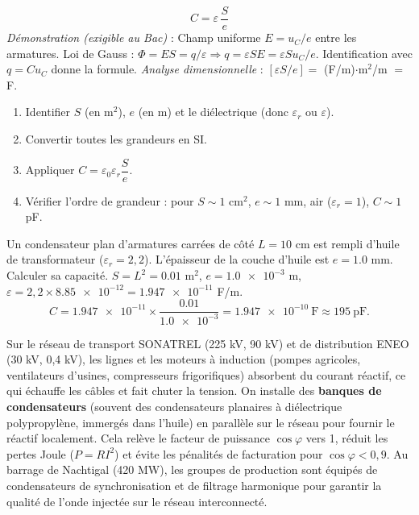 \documentclass[11pt]{article}
\begin{document}
\begin{propriete}
\[ C = \varepsilon\,\frac{S}{e} \]
\emph{Démonstration (exigible au Bac)} : Champ uniforme $E = u_C/e$ entre les armatures. Loi de Gauss : $\Phi = E S = q/\varepsilon \Rightarrow q = \varepsilon S E = \varepsilon S u_C/e$. Identification avec $q = C u_C$ donne la formule.
\emph{Analyse dimensionnelle} : $[\varepsilon S/e] = $ (F/m)$\cdot$m$^2$/m $=$ F.
\end{propriete}

\begin{methode}
\begin{enumerate}
\item Identifier $S$ (en m$^2$), $e$ (en m) et le diélectrique (donc $\varepsilon_r$ ou $\varepsilon$).
\item Convertir toutes les grandeurs en SI.
\item Appliquer $C = \varepsilon_0 \varepsilon_r \dfrac{S}{e}$.
\item Vérifier l'ordre de grandeur : pour $S \sim 1$ cm$^2$, $e \sim 1$ mm, air ($\varepsilon_r=1$), $C \sim 1$ pF.
\end{enumerate}
\end{methode}

\begin{exemplebox}
Un condensateur plan d'armatures carrées de côté $L = \num{10}$ cm est rempli d'huile de transformateur ($\varepsilon_r = 2,2$). L'épaisseur de la couche d'huile est $e = \num{1,0}$ mm. Calculer sa capacité.
\tcblower
$S = L^2 = \num{0,01}$ m$^2$, $e = \num{1,0e-3}$ m, $\varepsilon = 2,2 \times \num{8,85e-12} = \num{1,947e-11}$ F/m.
\[ C = \num{1,947e-11} \times \frac{\num{0,01}}{\num{1,0e-3}} = \num{1,947e-10}~\text{F} \approx \num{195}~\text{pF}. \]
\end{exemplebox}

\begin{savaistu}
Sur le réseau de transport SONATREL (225 kV, 90 kV) et de distribution ENEO (30 kV, 0,4 kV), les lignes et les moteurs à induction (pompes agricoles, ventilateurs d'usines, compresseurs frigorifiques) absorbent du courant réactif, ce qui échauffe les câbles et fait chuter la tension. On installe des \textbf{banques de condensateurs} (souvent des condensateurs planaires à diélectrique polypropylène, immergés dans l'huile) en parallèle sur le réseau pour fournir le réactif localement. Cela relève le facteur de puissance $\cos\varphi$ vers 1, réduit les pertes Joule ($P = RI^2$) et évite les pénalités de facturation pour $\cos\varphi < 0,9$. Au barrage de Nachtigal (420 MW), les groupes de production sont équipés de condensateurs de synchronisation et de filtrage harmonique pour garantir la qualité de l'onde injectée sur le réseau interconnecté.
\end{savaistu}
\end{document}
